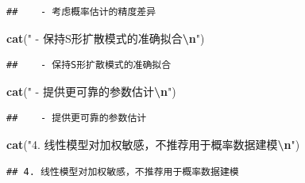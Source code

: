 \documentclass[
]{article}
\newenvironment{Shaded}{\begin{snugshade}}{\end{snugshade}}
\newcommand{\FunctionTok}[1]{\textcolor[rgb]{0.13,0.29,0.53}{\textbf{#1}}}
\newcommand{\NormalTok}[1]{#1}
\newcommand{\SpecialCharTok}[1]{\textcolor[rgb]{0.81,0.36,0.00}{\textbf{#1}}}
\newcommand{\StringTok}[1]{\textcolor[rgb]{0.31,0.60,0.02}{#1}}
\begin{document}
\begin{verbatim}
##    - 考虑概率估计的精度差异
\end{verbatim}

\begin{Shaded}
\begin{Highlighting}[]
\FunctionTok{cat}\NormalTok{(}\StringTok{"   {-} 保持S形扩散模式的准确拟合}\SpecialCharTok{\textbackslash{}n}\StringTok{"}\NormalTok{)}
\end{Highlighting}
\end{Shaded}

\begin{verbatim}
##    - 保持S形扩散模式的准确拟合
\end{verbatim}

\begin{Shaded}
\begin{Highlighting}[]
\FunctionTok{cat}\NormalTok{(}\StringTok{"   {-} 提供更可靠的参数估计}\SpecialCharTok{\textbackslash{}n}\StringTok{"}\NormalTok{)}
\end{Highlighting}
\end{Shaded}

\begin{verbatim}
##    - 提供更可靠的参数估计
\end{verbatim}

\begin{Shaded}
\begin{Highlighting}[]
\FunctionTok{cat}\NormalTok{(}\StringTok{"4. 线性模型对加权敏感，不推荐用于概率数据建模}\SpecialCharTok{\textbackslash{}n}\StringTok{"}\NormalTok{)}
\end{Highlighting}
\end{Shaded}

\begin{verbatim}
## 4. 线性模型对加权敏感，不推荐用于概率数据建模
\end{verbatim}
\end{document}
